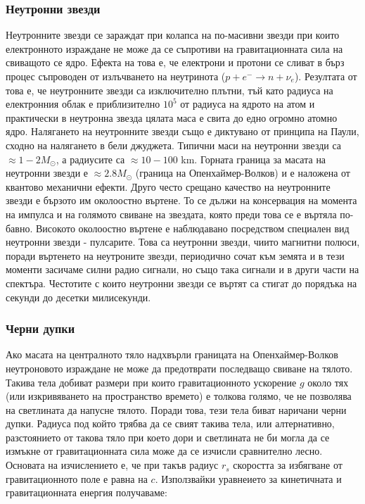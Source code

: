 \documentclass[a4paper,12pt]{article}
\begin{document}
\subsubsection{Неутронни звезди}
Неутронните звезди се зараждат при колапса на по-масивни звезди при които електронното израждане не може да се съпротиви на гравитационната сила на свиващото се ядро. Ефекта на това е, че електрони и протони се сливат в бърз процес съпроводен от излъчването на неутринота ($p + e^- \rightarrow n + \nu_e$). Резултата от това е, че неутронните звезди са изключително плътни, тъй като радиуса на електронния облак е приблизително $10^5$ от радиуса на ядрото на атом и практически в неутронна звезда цялата маса е свита до едно огромно атомно ядро. Налягането на неутронните звезди също е диктувано от принципа на Паули, сходно на налягането в бели джуджета. Типични маси на неутронни звезди са $\approx 1-2 M_\odot$, а радиусите са $\approx 10-100$ km. Горната граница за масата на неутронни звезди е $\approx 2.8 M_\odot$ (граница на Опенхаймер-Волков) и е наложена от квантово механични ефекти. Друго често срещано качество на неутронните звезди е бързото им околоостно въртене. То се дължи на консервация на момента на импулса и на голямото свиване на звездата, която преди това се е въртяла по-бавно. Високото околоостно въртене е наблюдавано посредством специален вид неутронни звезди - пулсарите. Това са неутронни звезди, чиито магнитни полюси, поради въртенето на неутроните звезди, периодично сочат към земята и в тези моменти засичаме силни радио сигнали, но също така сигнали и в други части на спектъра. Честотите с които неутронни звезди се въртят са стигат до порядъка на секунди до десетки милисекунди.

\subsubsection{Черни дупки}
Ако масата на централното тяло надхвърли границата на Опенхаймер-Волков неутроновото израждане не може да предотврати последващо свиване на тялото. Такива тела добиват размери при които гравитационното ускорение $g$ около тях (или изкривяването на пространство времето) е толкова голямо, че не позволява на светлината да напусне тялото. Поради това, тези тела биват наричани  черни дупки. Радиуса под който трябва да се свият такива тела, или алтернативно, разстоянието от такова тяло при което дори и светлината не би могла да се измъкне от гравитационната сила може да се изчисли сравнително лесно. Основата на изчислението е, че при такъв радиус $r_s$ скоростта за избягване от гравитационното поле е равна на $c$. Използвайки уравнеието за кинетичната и гравитационната енергия получаваме:
\end{document}
